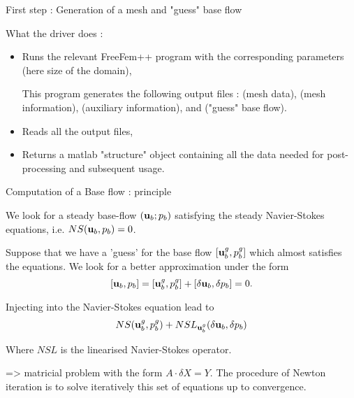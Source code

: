 \documentclass{beamer}
\newcommand{\be}[1]{ \begin{equation} \label{#1}}
\newcommand{\ee}{\end{equation}}
\newcommand{\ssp}{\vspace{.2cm} }
\begin{document}
\begin{frame}{First step : Generation of a mesh and "guess" base flow}

\small



\ssp

What the  driver does :

\begin{itemize}[<+->]
\item Runs the relevant FreeFem++ program   with the corresponding parameters (here size of the domain),

{\scriptsize This program generates the following output files :  (mesh data),  (mesh information),  (auxiliary information),  and  ("guess" base flow).}


\item Reads all the output files,

\item Returns a matlab "structure" object containing all the data needed for post-processing and subsequent usage.
 
\end{itemize}

\end{frame}



\begin{frame}{Computation of a Base flow : principle}

We look for a steady base-flow $({\bf u}_b;p_b)$ satisfying the steady Navier-Stokes equations, i.e. 
$NS ({\bf u}_b,p_b) = 0$.


Suppose that we have a 'guess' for the base flow $[{\bf u}_b^g,p_b^g]$  which almost satisfies the equations.  We look for a better approximation under the form
\be{Newton1}
[{\bf u}_b,p_b]  = [{\bf u}_b^g,p_b^g] + [\delta {\bf u}_b, \delta p_b] = 0.
\ee

Injecting into the Navier-Stokes equation lead to $$
NS ({\bf u}_b^g,p_b^g) + NSL_{{\bf u}_b^g}(\delta {\bf u}_b,\delta p_b)$$


Where $NSL$ is the linearised Navier-Stokes operator. 



=>  matricial problem with the form $A \cdot \delta X = Y$. The procedure of Newton iteration is to solve iteratively this set of equations up to convergence.

\end{frame}
\end{document}
